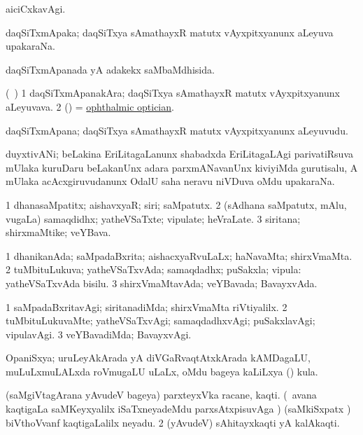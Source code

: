\bentry
{}
\gl{\kirxvi}
\bmng
aiciCxkavAgi. 
\emng
\eentry

\bentry
{}
\gl{\nA}
\bmng
daqSiTxmApaka; daqSiTxya sAmathayxR matutx vAyxpitxyanunx aLeyuva upakaraNa. 
\emng
\eentry

\bentry
{}
\gl{\gu}
\bmng
daqSiTxmApanada yA adakekx saMbaMdhisida. 
\emng
\eentry

\bentry
{}
\gl{\nA}
\bmng
(\kanmu\ \ame) 
\bnum
\num{1} daqSiTxmApanakAra; daqSiTxya sAmathayxR matutx vAyxpitxyanunx aLeyuvava. 
\num{2} (\ame) = \hyperlink{ophthalmic optician}{ophthalmic optician}. 
\enum
\emng
\eentry

\bentry
{}
\gl{\nA}
\bmng
daqSiTxmApana; daqSiTxya sAmathayxR matutx vAyxpitxyanunx aLeyuvudu. 
\emng
\eentry


\bentry
{}
\gl{\nA}
\bmng
duyxtivANi; beLakina EriLitagaLanunx shabadxda EriLitagaLAgi parivatiRsuva mUlaka kuruDaru beLakanUnx adara parxmANavanUnx kiviyiMda gurutisalu, A mUlaka acAcxgiruvudanunx OdalU saha neravu niVDuva oMdu upakaraNa. 
\emng
\eentry

\bentry
{}
\gl{\nA}
\bmng
\bnum
\num{1} dhanasaMpatitx; aishavxyaR; siri; saMpatutx. 
\num{2} (sAdhana saMpatutx, mAlu, \mo vugaLa) samaqdidhx; yatheVSaTxte; vipulate; heVraLate. 
\num{3} siritana; shirxmaMtike; veYBava. 
\enum
\emng
\eentry

\bentry
{}
\gl{\gu}
\bmng
\bnum
\num{1} dhanikanAda; saMpadaBxrita; aishacxyaRvuLaLx; haNavaMta; shirxVmaMta. 
\num{2} tuMbituLukuva; yatheVSaTxvAda; samaqdadhx; puSakxla; vipula:  yatheVSaTxvAda bisilu. 
\num{3} shirxVmaMtavAda; veYBavada; BavayxvAda. 
\enum
\emng
\eentry

\bentry
{}
\gl{\kirxvi}
\bmng
\bnum
\num{1} saMpadaBxritavAgi; siritanadiMda; shirxVmaMta riVtiyalilx. 
\num{2} tuMbituLukuvaMte; yatheVSaTxvAgi; samaqdadhxvAgi; puSakxlavAgi; vipulavAgi. 
\num{3} veYBavadiMda; BavayxvAgi. 
\enum
\emng
\eentry

\bentry
{}
\gl{\nA}
\bmng
OpaniSxya; uruLeyAkArada yA diVGaRvaqtAtxkArada kAMDagaLU, muLuLxmuLALxda roVmugaLU uLaLx, oMdu bageya kaLiLxya () kula. 
\emng
\eentry

\bentry
{}
\gl{\nA}
\bmng
\bnum
{} 
\banum
{} (saMgiVtagArana yAvudeV bageya) parxteyxVka racane, kaqti. 
 (\kanmu\ avana kaqtigaLa saMKeyxyalilx iSaTxneyadeMdu parxsAtxpisuvAga \parx) (saMkiSxpatx )  biVthoVvanf kaqtigaLalilx neyadu. 
\eanum
\numie
\num{2} (yAvudeV) sAhitayxkaqti yA kalAkaqti. 
\enum
\emng
\eentry

